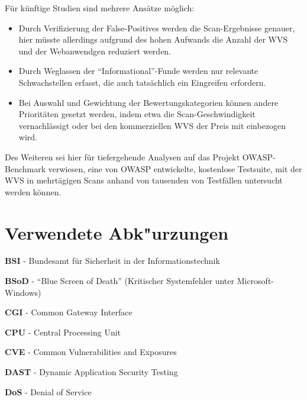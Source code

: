 \documentclass[12pt,oneside,a4paper,parskip,pointlessnumbers]{scrbook}
\begin{document}
Für künftige Studien sind mehrere Ansätze möglich:
\begin{itemize}
  \item Durch Verifizierung der False-Positives werden die Scan-Ergebnisse genauer, hier müsste allerdings aufgrund des hohen Aufwands die Anzahl der WVS und der Webanwendgen reduziert werden.
  \item Durch Weglassen der ``Informational''-Funde werden nur relevante Schwachstellen erfasst, die auch tatsächlich ein Eingreifen erfordern.
  \item Bei Auswahl und Gewichtung der Bewertungskategorien können andere Prioritäten gesetzt werden, indem etwa die Scan-Geschwindigkeit vernachlässigt oder bei den kommerziellen WVS der Preis mit einbezogen wird.
\end{itemize}
Des Weiteren sei hier für tiefergehende Analysen auf das Projekt OWASP-Benchmark \cite{OWASPbench} verwiesen, eine von OWASP entwickelte, kostenlose Testsuite, mit der WVS in mehrtägigen Scans anhand von tausenden von Testfällen untersucht werden können.








\cleardoublepage
{}
{}
\printbibliography[title=Quellenverzeichnis]

\appendix
  \chapter{Verwendete Abk"urzungen}
  \textbf{BSI} - Bundesamt für Sicherheit in der Informationstechnik

  \textbf{BSoD} - ``Blue Screen of Death'' (Kritischer Systemfehler unter Microsoft-Windows)

  \textbf{CGI} - Common Gateway Interface

  \textbf{CPU} - Central Processing Unit

  \textbf{CVE} - Common Vulnerabilities and Exposures

  \textbf{DAST} - Dynamic Application Security Testing

  \textbf{DoS} - Denial of Service
\end{document}

